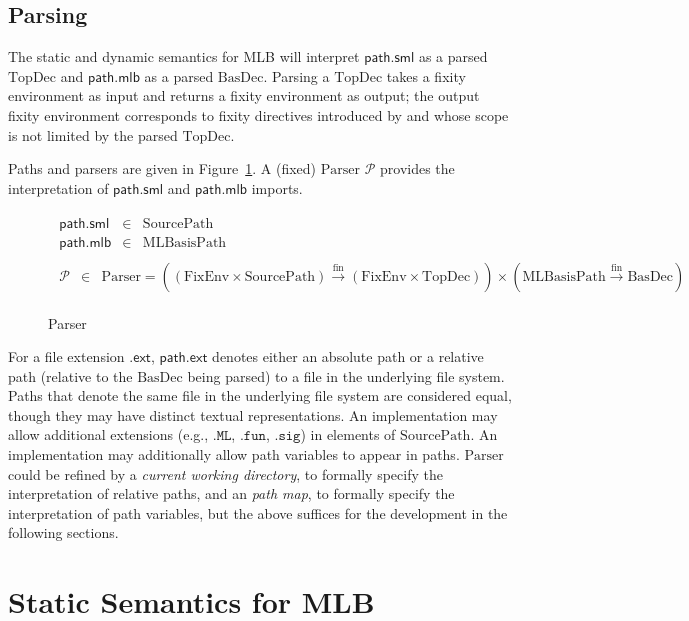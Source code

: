 \documentclass[draft]{article}
\newcommand{\mrm}[1]{\mathrm{#1}}
\newcommand{\mtt}[1]{\mathtt{#1}}
\newcommand{\mcal}[1]{\mathcal{#1}}
\newcommand{\msf}[1]{\mathsf{#1}}
\begin{document}
\subsection{Parsing}
The static and dynamic semantics for MLB will interpret
$\msf{path.sml}$ as a parsed $\mrm{TopDec}$ and
$\msf{path.mlb}$ as a parsed $\mrm{BasDec}$.  Parsing a $\mrm{TopDec}$
takes a fixity environment as input and returns a fixity environment
as output; the output fixity environment corresponds to fixity
directives introduced by and whose scope is not limited by the parsed
$\mrm{TopDec}$.

Paths and parsers are given in Figure~\ref{fig:mlb:S:PathsParser}.  A
(fixed) $\mrm{Parser}$ $\mcal{P}$ provides the interpretation of
$\msf{path.sml}$ and $\msf{path.mlb}$ imports.
\begin{figure}[h]
\begin{displaymath}
\begin{array}{c}
\begin{array}{rcl}
\msf{path.sml} & \in & \mrm{SourcePath} \\
\msf{path.mlb} & \in & \mrm{MLBasisPath} 
\end{array} \\
\begin{array}{rcl}
\mcal{P} & \in & \mrm{Parser} = 
((\mrm{FixEnv} \times \mrm{SourcePath})
 \xrightarrow{\mrm{fin}} (\mrm{FixEnv} \times \mrm{TopDec})) 
\times 
(\mrm{MLBasisPath} \xrightarrow{\mrm{fin}} \mrm{BasDec}) 
\end{array}
\end{array}
\end{displaymath}
\caption{Parser}\label{fig:mlb:S:PathsParser}
\end{figure}
%
For a file extension $\msf{.ext}$, $\msf{path.ext}$ denotes either an
absolute path or a relative path (relative to the $\mrm{BasDec}$ being
parsed) to a file in the underlying file system.  Paths that denote the same
file in the underlying file system are considered equal, though they may
have distinct textual representations.  An implementation
may allow additional extensions (e.g., $\mtt{.ML}$, $\mtt{.fun}$,
$\mtt{.sig}$) in elements of $\mrm{SourcePath}$.  An implementation
may additionally allow path variables to appear in
paths.  $\mrm{Parser}$ could be refined by a \emph{current working
directory}, to formally specify the interpretation of relative paths,
and an \emph{path map}, to formally specify the
interpretation of path variables, but the above suffices
for the development in the following sections.
%
\section{Static Semantics for MLB}
%
\end{document}
